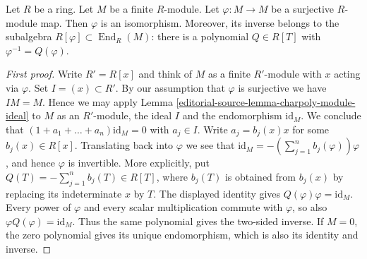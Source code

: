 \begin{lemma}
\label{editorial-source-lemma-fun}
Let $R$ be a ring.
Let $M$ be a finite $R$-module.
Let $\varphi : M \to M$ be a surjective $R$-module map.
Then $\varphi$ is an isomorphism. Moreover, its inverse belongs
to the subalgebra $R[\varphi]\subset\operatorname{End}_R(M)$:
there is a polynomial $Q\in R[T]$ with $\varphi^{-1}=Q(\varphi)$.
\end{lemma}

\begin{proof}[First proof]
Write $R' = R[x]$ and think of $M$ as a finite $R'$-module with
$x$ acting via $\varphi$. Set $I = (x) \subset R'$. By our assumption that
$\varphi$ is surjective we have $IM = M$. Hence we may apply
Lemma \ref{editorial-source-lemma-charpoly-module-ideal}
to $M$ as an $R'$-module, the ideal $I$ and the endomorphism $\text{id}_M$.
We conclude that
$(1 + a_1 + \ldots + a_n)\text{id}_M = 0$ with $a_j \in I$.
Write $a_j = b_j(x)x$ for some $b_j(x) \in R[x]$.
Translating back into $\varphi$ we see that
$\text{id}_M = -(\sum_{j = 1}^{n} b_j(\varphi)) \varphi$, and hence
$\varphi$ is invertible. More explicitly, put
$Q(T)=-\sum_{j=1}^{n}b_j(T)\in R[T]$, where $b_j(T)$ is
obtained from $b_j(x)$ by replacing its indeterminate $x$ by $T$.
The displayed identity gives $Q(\varphi)\varphi=\mathrm{id}_M$.
Every power of $\varphi$ and every scalar multiplication commute
with $\varphi$, so also $\varphi Q(\varphi)=\mathrm{id}_M$.
Thus the same polynomial gives the two-sided inverse.
If $M=0$, the zero polynomial gives its unique endomorphism,
which is also its identity and inverse.
\end{proof}